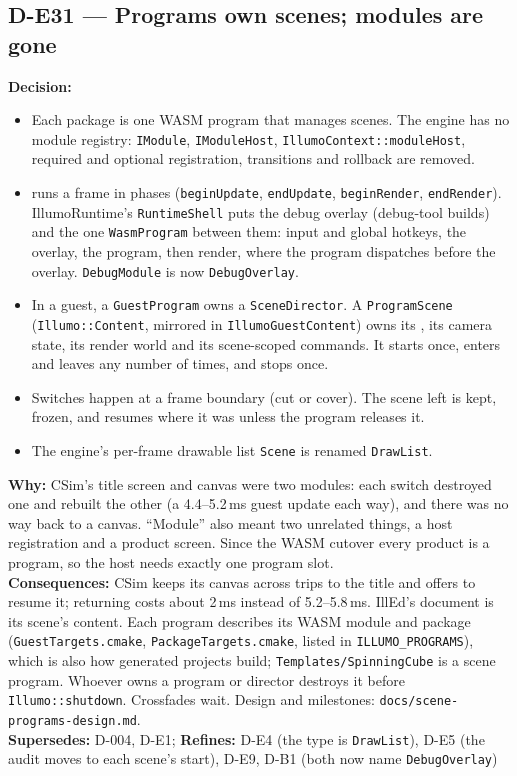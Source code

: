 \subsection*{D-E31 --- Programs own scenes; modules are gone}
\begin{decisionbox}[title={D-E31 \quad 2026-09-26}]
\textbf{Decision:}
\begin{itemize}
  \item Each package is one WASM program that manages scenes. The engine has
    no module registry: \texttt{IModule}, \texttt{IModuleHost},
    \texttt{IllumoContext::moduleHost}, required and optional registration,
    transitions and rollback are removed.
  \item {} runs a frame in phases (\texttt{beginUpdate},
    \texttt{endUpdate}, \texttt{beginRender}, \texttt{endRender}). IllumoRuntime's
    \texttt{RuntimeShell} puts the debug overlay (debug-tool builds) and the
    one \texttt{WasmProgram} between them: input and global hotkeys, the
    overlay, the program, then render, where the program dispatches before the
    overlay. \texttt{DebugModule} is now \texttt{DebugOverlay}.
  \item In a guest, a \texttt{GuestProgram} owns a \texttt{SceneDirector}. A
    \texttt{ProgramScene} (\texttt{Illumo::Content}, mirrored in
    \texttt{IllumoGuestContent}) owns its , its camera
    state, its render world and its scene-scoped commands. It starts once,
    enters and leaves any number of times, and stops once.
  \item Switches happen at a frame boundary (cut or cover). The scene left is
    kept, frozen, and resumes where it was unless the program releases it.
  \item The engine's per-frame drawable list \texttt{Scene} is renamed
    \texttt{DrawList}.
\end{itemize}
\textbf{Why:} CSim's title screen and canvas were two modules: each switch
destroyed one and rebuilt the other (a 4.4--5.2\,ms guest update each way),
and there was no way back to a canvas. ``Module'' also meant two unrelated
things, a host registration and a product screen. Since the WASM cutover every
product is a program, so the host needs exactly one program slot.\\
\textbf{Consequences:} CSim keeps its canvas across trips to the title and
offers to resume it; returning costs about 2\,ms instead of 5.2--5.8\,ms.
IllEd's document is its scene's content. Each program describes its WASM
module and package (\texttt{GuestTargets.cmake},
\texttt{PackageTargets.cmake}, listed in \texttt{ILLUMO\_PROGRAMS}), which is
also how generated projects build; \texttt{Templates/SpinningCube} is a scene
program. Whoever owns a program or director destroys it before
\texttt{Illumo::shutdown}. Crossfades wait. Design and milestones:
\texttt{docs/scene-programs-design.md}.\\
\textbf{Supersedes:} D-004, D-E1; \textbf{Refines:} D-E4 (the type is
\texttt{DrawList}), D-E5 (the audit moves to each scene's start), D-E9, D-B1
(both now name \texttt{DebugOverlay})
\end{decisionbox}


